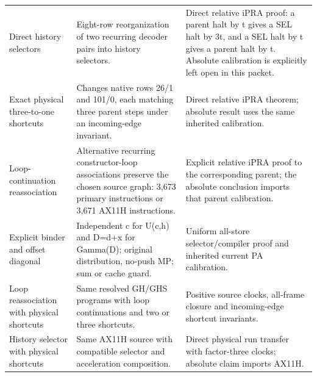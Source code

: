 \begin{longtable}{p{}p{}p{}}
Direct history selectors & Eight-row reorganization of two recurring decoder pairs into history selectors. & Direct relative iPRA proof: a parent halt by t gives a SEL halt by 3t, and a SEL halt by t gives a parent halt by t. Absolute calibration is explicitly left open in this packet. \\
Exact physical three-to-one shortcuts & Changes native rows 26/1 and 101/0, each matching three parent steps under an incoming-edge invariant. & Direct relative iPRA theorem; absolute result uses the same inherited calibration. \\
Loop-continuation reassociation & Alternative recurring constructor-loop associations preserve the chosen source graph: 3,673 primary instructions or 3,671 AX11H instructions. & Explicit relative iPRA proof to the corresponding parent; the absolute conclusion imports that parent calibration. \\
Explicit binder and offset diagonal & Independent c for U(c,h) and D=d+x for Gamma(D); original distribution, no-push MP; sum or cache guard. & Uniform all-store selector/compiler proof and inherited current PA calibration. \\
Loop reassociation with physical shortcuts & Same resolved GH/GHS programs with loop continuations and two or three shortcuts. & Positive source clocks, all-frame closure and incoming-edge shortcut invariants. \\
History selector with physical shortcuts & Same AX11H source with compatible selector and acceleration composition. & Direct physical run transfer with factor-three clocks; absolute claim imports AX11H. \\
\end{longtable}
\endgroup
